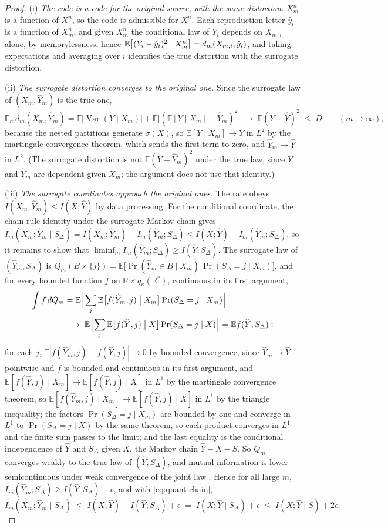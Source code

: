 \documentclass[11pt,onecolumn]{IEEEtran}
\newcommand{\E}{\mathbb{E}}
\newcommand{\R}{\mathbb{R}}
\newcommand{\hY}{\widehat{Y}}
\begin{document}
\begin{proof}
(i) \emph{The code is a code for the original source, with the same
distortion.} $X_m^n$ is a function of $X^n$, so the code is admissible
for $X^n$. Each reproduction letter $\hat y_i$ is a function of $X_m^n$,
and given $X_m^n$ the conditional law of $Y_i$ depends on $X_{m,i}$
alone, by memorylessness; hence
$\E\bigl[(Y_i-\hat y_i)^2\bigm|X_m^n\bigr]=d_m(X_{m,i},\hat y_i)$, and
taking expectations and averaging over $i$ identifies the true
distortion with the surrogate distortion.

(ii) \emph{The surrogate distortion converges to the original one.}
Since the surrogate law of $(X_m,\hY_m)$ is the true one,
\[
\E_m d_m(X_m,\hY_m)
=\E\bigl[\operatorname{Var}(Y\mid X_m)\bigr]
+\E\bigl[(\E[Y\mid X_m]-\hY_m)^2\bigr]
\;\longrightarrow\;\E(Y-\hY)^2\;\le\;D
\qquad(m\to\infty),
\]
because the nested partitions generate $\sigma(X)$, so
$\E[Y\mid X_m]\to Y$ in $L^2$ by the martingale convergence theorem,
which sends the first term to zero, and $\hY_m\to\hY$ in $L^2$. (The
surrogate distortion is not $\E(Y-\hY_m)^2$ under the true law, since
$Y$ and $\hY_m$ are dependent given $X_m$; the argument does not use
that identity.)

(iii) \emph{The surrogate coordinates approach the original ones.} The
rate obeys $I(X_m;\hY_m)\le I(X;\hY)$ by data processing. For the
conditional coordinate, the chain-rule identity under the surrogate
Markov chain gives
$I_m(X_m;\hY_m\mid S_\Delta)=I(X_m;\hY_m)-I_m(\hY_m;S_\Delta)
\le I(X;\hY)-I_m(\hY_m;S_\Delta)$, so it remains to show that
$\liminf_mI_m(\hY_m;S_\Delta)\ge I(\hY;S_\Delta)$. The surrogate law of
$(\hY_m,S_\Delta)$ is
$Q_m(B\times\{j\})=\E\bigl[\Pr(\hY_m\in B\mid X_m)\,
\Pr(S_\Delta=j\mid X_m)\bigr]$, and for every bounded function $f$ on
$\R\times q_\kappa(\R^r)$, continuous in its first argument,
\begin{align*}
\int f\,dQ_m
&=\E\Bigl[\sum_j\E\bigl[f(\hY_m,j)\bigm|X_m\bigr]\Pr(S_\Delta=j\mid X_m)\Bigr]\\
&\longrightarrow\;
\E\Bigl[\sum_j\E\bigl[f(\hY,j)\bigm|X\bigr]\Pr(S_\Delta=j\mid X)\Bigr]
=\E f(\hY,S_\Delta):
\end{align*}
for each $j$, $\E|f(\hY_m,j)-f(\hY,j)|\to0$ by bounded convergence,
since $\hY_m\to\hY$ pointwise and $f$ is bounded and continuous in its
first argument, and $\E[f(\hY,j)\mid X_m]\to\E[f(\hY,j)\mid X]$ in $L^1$
by the martingale convergence theorem, so
$\E[f(\hY_m,j)\mid X_m]\to\E[f(\hY,j)\mid X]$ in $L^1$ by the triangle
inequality; the factors $\Pr(S_\Delta=j\mid X_m)$ are bounded by one and
converge in $L^1$ to $\Pr(S_\Delta=j\mid X)$ by the same theorem, so each
product converges in $L^1$ and the finite sum passes to the limit;
and the last equality is the conditional independence of $\hY$ and
$S_\Delta$ given $X$, the Markov chain $\hY-X-S$. So $Q_m$ converges
weakly to the true law of $(\hY,S_\Delta)$, and mutual information is
lower semicontinuous under weak convergence of the joint law
\cite{posner1975}. Hence for all large $m$,
$I_m(\hY_m;S_\Delta)\ge I(\hY;S_\Delta)-\epsilon$, and with
\eqref{eq:quant-chain},
\[
I_m(X_m;\hY_m\mid S_\Delta)\;\le\;I(X;\hY)-I(\hY;S_\Delta)+\epsilon
\;=\;I(X;\hY\mid S_\Delta)+\epsilon\;\le\;I(X;\hY\mid S)+2\epsilon .
\]


\end{proof}
\end{document}
